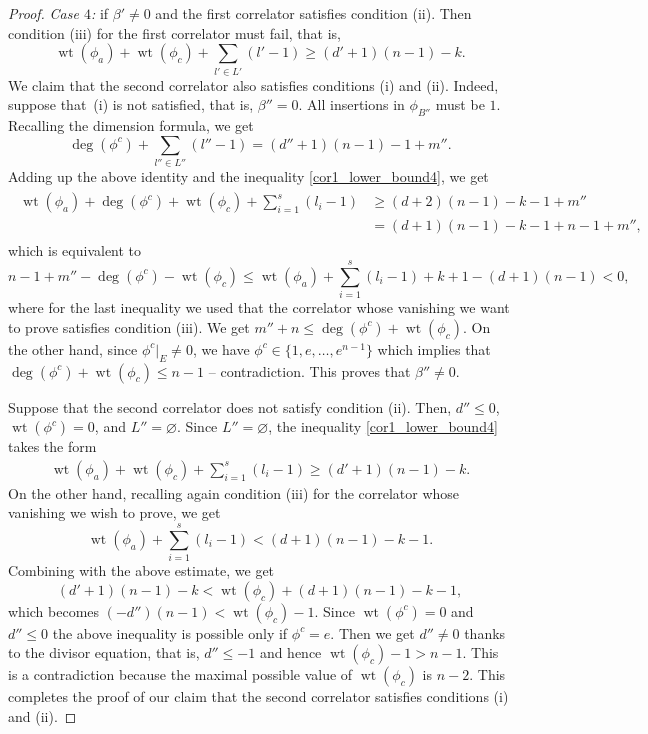 \documentclass[pdftex]{sigma}
\numberwithin{equation}{section}
\begin{document}
\begin{proof}
{\em Case $4$:} if $\beta'\neq 0$ and the first correlator satisfies condition (ii). Then condition (iii) for the first correlator must fail, that is,
\begin{equation}\label{cor1_lower_bound4}
\operatorname{wt}(\phi_a) + \operatorname{wt}(\phi_c) +\sum_{l'\in L'} (l'-1)
\geq (d'+1)(n-1) - k.
\end{equation}
We claim that the second correlator also satisfies conditions (i) and (ii). Indeed, suppose that~(i) is not satisfied, that is, $\beta''=0$. All insertions in $\phi_{B''}$ must be $1$. Recalling the dimension formula, we get
\[
\operatorname{deg}(\phi^c)+\sum_{l''\in L''} (l''-1) = (d''+1)(n-1) -1 + m''.
\]
Adding up the above identity and the inequality \eqref{cor1_lower_bound4}, we get
\begin{align*}
\begin{aligned}
\operatorname{wt}(\phi_a) + \operatorname{deg}(\phi^c)+ \operatorname{wt}(\phi_c) +
\sum_{i=1}^s (l_i-1) &\geq (d+2)(n-1) - k-1+m'' \\
&=
(d+1)(n-1) -k-1 + n-1+m'',
\end{aligned}
\end{align*}
which is equivalent to
\[
n-1+m''- \operatorname{deg}(\phi^c)- \operatorname{wt}(\phi_c)\leq
\operatorname{wt}(\phi_a) + \sum_{i=1}^s (l_i-1)+k+1 - (d+1)(n-1)<0,
\]
where for the last inequality we used that the correlator whose vanishing we want to prove satisfies condition (iii). We get $m''+n\leq \operatorname{deg}(\phi^c)+ \operatorname{wt}(\phi_c)$. On the other hand, since $\phi^c|_{E}\neq 0$, we have $\phi^c\in \big\{1,e,\dots, e^{n-1}\big\}$ which implies that $\operatorname{deg}(\phi^c)+ \operatorname{wt}(\phi_c)\leq n-1$ -- contradiction. This proves that $\beta''\neq 0$.

Suppose that the second correlator does not satisfy condition (ii). Then, $d''\leq 0$, $\operatorname{wt}(\phi^c)=0$, and $L''=\varnothing$. Since $L''=\varnothing$, the inequality \eqref{cor1_lower_bound4} takes the form
\begin{align*}
\operatorname{wt}(\phi_a) + \operatorname{wt}(\phi_c) +\sum_{i=1}^s (l_i-1)
\geq (d'+1)(n-1) - k.
\end{align*}
On the other hand, recalling again condition (iii) for the correlator whose vanishing we wish to prove, we get \[
\operatorname{wt}(\phi_a) +\sum_{i=1}^s (l_i-1) <(d+1)(n-1)-k-1.\] Combining with the above estimate, we get
\[
(d'+1)(n-1)-k < \operatorname{wt}(\phi_c) + (d+1)(n-1)-k-1,
\]
which becomes $(-d'')(n-1)< \operatorname{wt}(\phi_c) -1$. Since $\operatorname{wt}(\phi^c)=0$ and $d''\leq 0$ the above inequality is possible only if $\phi^c=e$. Then we get $d''\neq 0$ thanks to the divisor equation, that is, $d''\leq -1$ and hence $ \operatorname{wt}(\phi_c) -1> n-1$. This is a contradiction because the maximal possible value of $\operatorname{wt}(\phi_c)$ is $n-2$. This completes the proof of our claim that the second correlator satisfies conditions (i) and (ii).


\end{proof}
\end{document}
